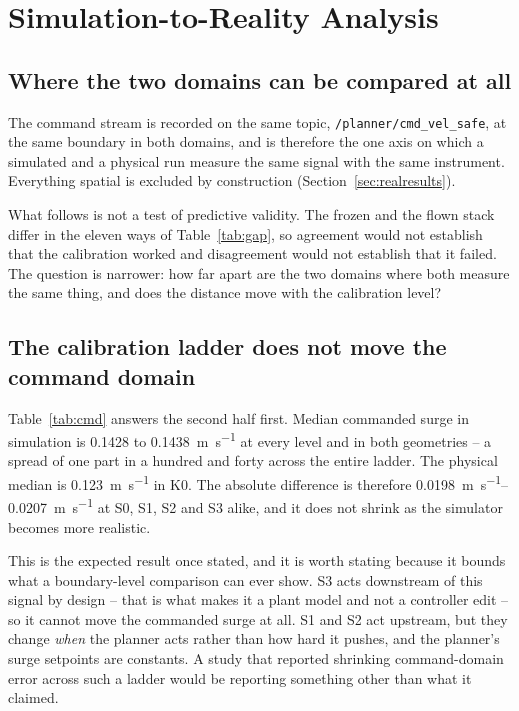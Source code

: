 \section{Simulation-to-Reality Analysis}
\label{sec:simreal}

\subsection{Where the two domains can be compared at all}

The command stream is recorded on the same topic,
\texttt{/planner/cmd\_vel\_safe}, at the same boundary in both domains,
and is therefore the one axis on which a simulated and a physical run
measure the same signal with the same instrument. Everything spatial is
excluded by construction (Section~\ref{sec:realresults}).

What follows is not a test of predictive validity. The frozen and the
flown stack differ in the eleven ways of Table~\ref{tab:gap}, so
agreement would not establish that the calibration worked and
disagreement would not establish that it failed. The question is
narrower: how far apart are the two domains where both measure the same
thing, and does the distance move with the calibration level?

\subsection{The calibration ladder does not move the command domain}

Table~\ref{tab:cmd} answers the second half first. Median commanded surge
in simulation is \SI{0.1428}{} to \SI{0.1438}{\metre\per\second} at every
level and in both geometries -- a spread of one part in a hundred and
forty across the entire ladder. The physical median is
\SI{0.123}{\metre\per\second} in \textsf{K0}. The absolute difference is
therefore \SIrange{0.0198}{0.0207}{\metre\per\second} at S0, S1, S2 and
S3 alike, and it does not shrink as the simulator becomes more realistic.

This is the expected result once stated, and it is worth stating because
it bounds what a boundary-level comparison can ever show. S3 acts
downstream of this signal by design -- that is what makes it a plant
model and not a controller edit -- so it cannot move the commanded surge
at all. S1 and S2 act upstream, but they change \emph{when} the planner
acts rather than how hard it pushes, and the planner's surge setpoints
are constants. A study that reported shrinking command-domain error
across such a ladder would be reporting something other than what it
claimed.

